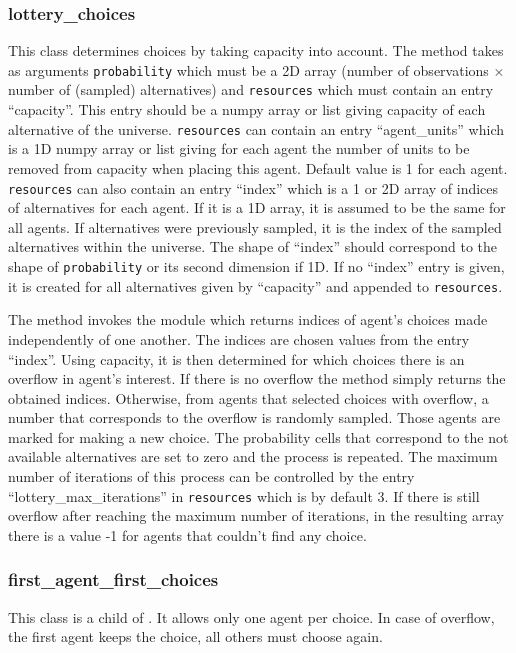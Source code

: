 \subsubsection{lottery_choices}
%
This class determines choices by taking capacity into account. The
 method takes as arguments \verb|probability| which must be a 2D
array (number of observations $\times$ number of (sampled) alternatives) and
\verb|resources| which must contain an entry ``capacity''. This entry should
be a numpy array \numpyindex or list giving capacity of each alternative of the universe.
\verb|resources| can contain an entry ``agent_units'' which is a 1D numpy array \numpyindex
or list giving for each agent the number of units to be removed from capacity
when placing this agent. Default value is 1 for each agent.  \verb|resources|
can also contain an entry ``index'' which is a 1 or 2D array of indices of
alternatives for each agent. If it is a 1D array, it is assumed to be the same
for all agents. If alternatives were previously sampled, it is the index of
the sampled alternatives within the universe. The shape of ``index'' should
correspond to the shape of \verb|probability| or its second dimension if 1D.
If no ``index'' entry is given, it is created for all alternatives given by
``capacity'' and appended to \verb|resources|.

The  method invokes the  module
 which returns indices of agent's
choices made independently of one another.  The indices are chosen
values from the entry ``index''. Using capacity, it is then
determined for which choices there is an overflow in agent's
interest. If there is no overflow the method simply returns the
obtained indices. Otherwise, from agents that selected choices with
overflow, a number that corresponds to the overflow is randomly
sampled. Those agents are marked for making a new choice.  The
probability cells that correspond to the not available alternatives
are set to zero and the process is repeated.  The maximum number of
iterations of this process can be controlled by the entry
``lottery_max_iterations'' in \verb|resources| which is by default
3. If there is still overflow after reaching the maximum number of
iterations, in the resulting array there is a value -1 for agents
that couldn't find any choice.


\subsubsection{first_agent_first_choices}
%
This class is a child of . It allows only one agent per
choice. In case of overflow, the first agent keeps the choice, all others must
choose again.


